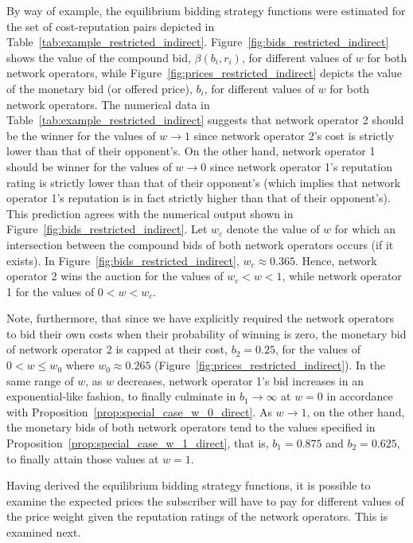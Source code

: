 By way of example, the equilibrium bidding strategy functions were estimated for the set of cost-reputation pairs depicted in Table~\ref{tab:example_restricted_indirect}. Figure~\ref{fig:bids_restricted_indirect} shows the value of the compound bid, $\beta(b_i,r_i)$, for different values of $w$ for both network operators, while Figure~\ref{fig:prices_restricted_indirect} depicts the value of the monetary bid (or offered price), $b_i$, for different values of $w$ for both network operators. The numerical data in Table~\ref{tab:example_restricted_indirect} suggests that network operator 2 should be the winner for the values of $w\rightarrow 1$ since network operator 2's cost is strictly lower than that of their opponent's. On the other hand, network operator 1 should be winner for the values of $w\rightarrow 0$ since network operator 1's reputation rating is strictly lower than that of their opponent's (which implies that network operator 1's reputation is in fact strictly higher than that of their opponent's). This prediction agrees with the numerical output shown in Figure~\ref{fig:bids_restricted_indirect}. Let $w_c$ denote the value of $w$ for which an intersection between the compound bids of both network operators occurs (if it exists). In Figure~\ref{fig:bids_restricted_indirect}, $w_c\approx 0.365$. Hence, network operator 2 wins the auction for the values of $w_c < w < 1$, while network operator 1 for the values of $0 < w < w_c$.

Note, furthermore, that since we have explicitly required the network operators to bid their own costs when their probability of winning is zero, the monetary bid of network operator 2 is capped at their cost, $b_2 = 0.25$, for the values of $0 < w \le w_0$ where $w_0\approx 0.265$ (Figure~\ref{fig:prices_restricted_indirect}). In the same range of $w$, as $w$ decreases, network operator 1's bid increases in an exponential-like fashion, to finally culminate in $b_1\to\infty$ at $w=0$ in accordance with Proposition~\ref{prop:special_case_w_0_direct}. As $w\to 1$, on the other hand, the monetary bids of both network operators tend to the values specified in Proposition~\ref{prop:special_case_w_1_direct}, that is, $b_1=0.875$ and $b_2=0.625$, to finally attain those values at $w=1$.

Having derived the equilibrium bidding strategy functions, it is possible to examine the expected prices the subscriber will have to pay for different values of the price weight given the reputation ratings of the network operators. This is examined next.

